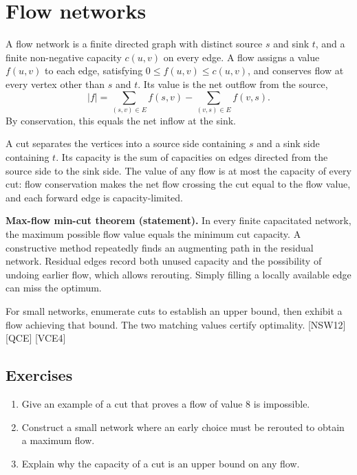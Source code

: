 \chapter{Flow networks}
A flow network is a finite directed graph with distinct source $s$ and sink $t$, and a finite non-negative capacity $c(u,v)$ on every edge. A flow assigns a value $f(u,v)$ to each edge, satisfying $0\leq f(u,v)\leq c(u,v)$, and conserves flow at every vertex other than $s$ and $t$. Its value is the net outflow from the source,
\[
  |f|=\sum_{(s,v)\in E} f(s,v)-\sum_{(v,s)\in E} f(v,s).
\]
By conservation, this equals the net inflow at the sink.

A cut separates the vertices into a source side containing $s$ and a sink side containing $t$. Its capacity is the sum of capacities on edges directed from the source side to the sink side. The value of any flow is at most the capacity of every cut: flow conservation makes the net flow crossing the cut equal to the flow value, and each forward edge is capacity-limited.

\textbf{Max-flow min-cut theorem (statement).} In every finite capacitated network, the maximum possible flow value equals the minimum cut capacity. A constructive method repeatedly finds an augmenting path in the residual network. Residual edges record both unused capacity and the possibility of undoing earlier flow, which allows rerouting. Simply filling a locally available edge can miss the optimum.

For small networks, enumerate cuts to establish an upper bound, then exhibit a flow achieving that bound. The two matching values certify optimality. [NSW12] [QCE] [VCE4]

\section*{Exercises}
\begin{enumerate}
\item Give an example of a cut that proves a flow of value 8 is impossible.
\item Construct a small network where an early choice must be rerouted to obtain a maximum flow.
\item Explain why the capacity of a cut is an upper bound on any flow.
\end{enumerate}
